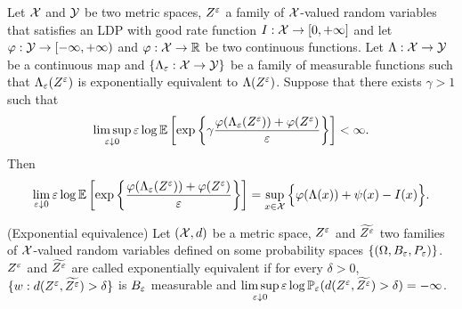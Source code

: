 {\begin{theorem}
Let $\mathcal{X}$ and $\mathcal{Y}$ be two metric spaces, $Z^{\varepsilon}$ a family of $\mathcal{X}$-valued random variables that satisfies an LDP with good rate function $I:\mathcal{X}\rightarrow [0,+\infty]$ and let $\varphi : \mathcal{Y} \rightarrow [-\infty,+\infty)$ and $\varphi : \mathcal{X} \rightarrow \mathbb{R}$  be two continuous functions. Let $\Lambda : \mathcal{X} \rightarrow \mathcal{Y}$ be a continuous map and $\{\Lambda_{\varepsilon} : \mathcal{X} \rightarrow \mathcal{Y}\}$ be a family of measurable functions such that $\Lambda_{\varepsilon}(Z^{\varepsilon})$ is exponentially equivalent to $\Lambda(Z^{\varepsilon})$. Suppose that there exists $\gamma > 1$ such that
$$
\limsup\limits_{\varepsilon \downarrow 0}
\varepsilon\log \mathbb{E}\left[\exp\left\{\gamma \frac{\varphi(\Lambda_{\varepsilon}(Z^{\varepsilon})) + \varphi(Z^{\varepsilon})}{\varepsilon}\right\}\right]< \infty.
$$
Then
$$
\lim_{\varepsilon \downarrow 0}
\varepsilon\log \mathbb{E}\left[\exp\left\{\frac{\varphi(\Lambda_{\varepsilon}(Z^{\varepsilon})) + \varphi(Z^{\varepsilon})}{\varepsilon}\right\}\right]
= \sup\limits_{x \in \mathcal{X}} \Big\{\varphi(\Lambda(x)) + \psi(x) - I(x) \Big\}.
$$
\end{theorem}
\begin{definition} (Exponential equivalence)\label{def:exponential_equivalence}
Let $(\mathcal{X},d)$ be a metric space, $Z^{\varepsilon}$ and $\widetilde{Z^\varepsilon}$ two families of $\mathcal{X}$-valued random variables defined on some probability spaces $\{ (\Omega,B_{\varepsilon},P_\varepsilon)\}$. $Z^{\varepsilon}$ and $\widetilde{Z^\varepsilon}$ are called exponentially equivalent if for every $\delta > 0$,
$\{w: d(Z^{\varepsilon},\widetilde{Z^\varepsilon}) > \delta\}$ is $B_\varepsilon$ measurable
and $\limsup\limits_{\varepsilon \downarrow 0} \varepsilon\log\mathbb{P}_\varepsilon(d(Z^{\varepsilon},\widetilde{Z^\varepsilon}) > \delta) = - \infty$.
\end{definition}}
